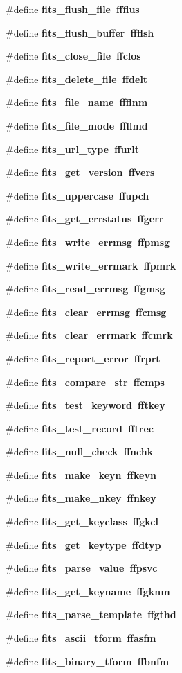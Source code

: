 \begin{CompactItemize}
\item 
\#define \bf{fits\_\-flush\_\-file}~ffflus
\item 
\#define \bf{fits\_\-flush\_\-buffer}~ffflsh
\item 
\#define \bf{fits\_\-close\_\-file}~ffclos
\item 
\#define \bf{fits\_\-delete\_\-file}~ffdelt
\item 
\#define \bf{fits\_\-file\_\-name}~ffflnm
\item 
\#define \bf{fits\_\-file\_\-mode}~ffflmd
\item 
\#define \bf{fits\_\-url\_\-type}~ffurlt
\item 
\#define \bf{fits\_\-get\_\-version}~ffvers
\item 
\#define \bf{fits\_\-uppercase}~ffupch
\item 
\#define \bf{fits\_\-get\_\-errstatus}~ffgerr
\item 
\#define \bf{fits\_\-write\_\-errmsg}~ffpmsg
\item 
\#define \bf{fits\_\-write\_\-errmark}~ffpmrk
\item 
\#define \bf{fits\_\-read\_\-errmsg}~ffgmsg
\item 
\#define \bf{fits\_\-clear\_\-errmsg}~ffcmsg
\item 
\#define \bf{fits\_\-clear\_\-errmark}~ffcmrk
\item 
\#define \bf{fits\_\-report\_\-error}~ffrprt
\item 
\#define \bf{fits\_\-compare\_\-str}~ffcmps
\item 
\#define \bf{fits\_\-test\_\-keyword}~fftkey
\item 
\#define \bf{fits\_\-test\_\-record}~fftrec
\item 
\#define \bf{fits\_\-null\_\-check}~ffnchk
\item 
\#define \bf{fits\_\-make\_\-keyn}~ffkeyn
\item 
\#define \bf{fits\_\-make\_\-nkey}~ffnkey
\item 
\#define \bf{fits\_\-get\_\-keyclass}~ffgkcl
\item 
\#define \bf{fits\_\-get\_\-keytype}~ffdtyp
\item 
\#define \bf{fits\_\-parse\_\-value}~ffpsvc
\item 
\#define \bf{fits\_\-get\_\-keyname}~ffgknm
\item 
\#define \bf{fits\_\-parse\_\-template}~ffgthd
\item 
\#define \bf{fits\_\-ascii\_\-tform}~ffasfm
\item 
\#define \bf{fits\_\-binary\_\-tform}~ffbnfm

\end{CompactItemize}
